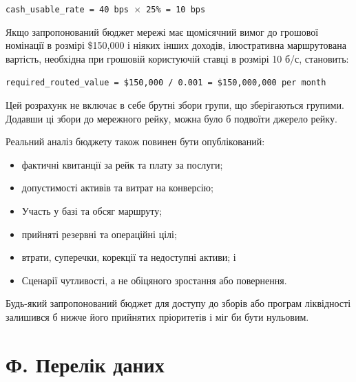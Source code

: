 \documentclass[11pt]{article}
\begin{document}
\texttt{cash\_usable\_rate = 40 bps $\times$ 25\% = 10 bps}

Якщо запропонований бюджет мережі має щомісячний вимог до грошової номінації в розмірі \$150,000 і ніяких інших доходів, ілюстративна маршрутована вартість, необхідна при грошовій користуючій ставці в розмірі 10 б/с, становить:

\texttt{required\_routed\_value = \$150,000 / 0.001 = \$150,000,000 per month}

Цей розрахунк не включає в себе брутні збори групи, що зберігаються групими. Додавши ці збори до мережного рейку, можна було б подвоїти джерело рейку.

Реальний аналіз бюджету також повинен бути опублікований:

\begin{itemize}[leftmargin=*]
\item фактичні квитанції за рейк та плату за послуги;
\item допустимості активів та витрат на конверсію;
\item Участь у базі та обсяг маршруту;
\item прийняті резервні та операційні цілі;
\item втрати, суперечки, корекції та недоступні активи; і
\item Сценарії чутливості, а не обіцяного зростання або повернення.
\end{itemize}
Будь-який запропонований бюджет для доступу до зборів або програм ліквідності залишився б нижче його прийнятих пріоритетів і міг би бути нульовим.


\section*{Ф. Перелік даних}
\end{document}
